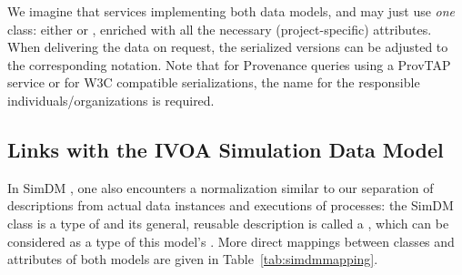 We imagine that services implementing both data models,  and  may just use \emph{one} class: either  or , enriched with all the necessary (project-specific) attributes. When delivering the data on request, the serialized versions can be adjusted to the corresponding notation.
Note that for Provenance queries using a ProvTAP service or for W3C compatible serializations, the name  for the responsible individuals/organizations is required.




\subsection{Links with the IVOA Simulation Data Model}

In SimDM \citep{2012ivoa.spec.0503L}, one also encounters a normalization similar to our separation of descriptions from 
actual data instances and executions of processes: the SimDM class 
is a type of  and its general, reusable description is called a ,
which can be considered as a type of this model's . 
More direct mappings between classes and attributes of both models are given in Table~\ref{tab:simdmmapping}.

